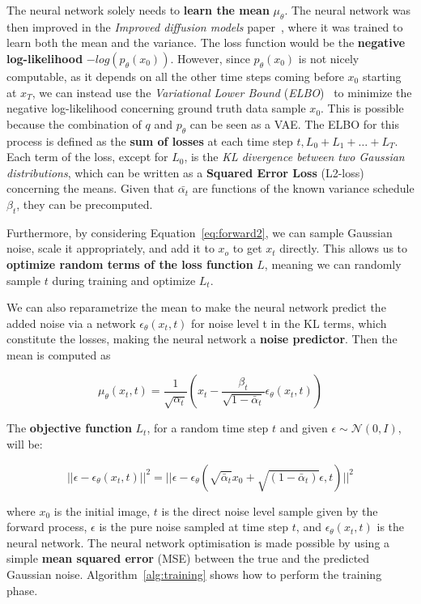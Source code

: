 \documentclass[preprint]{elsarticle}
\begin{document}
The neural network solely needs to \textbf{learn the mean} $\mu_\theta$.
The neural network was then improved in the \emph{Improved diffusion models} paper~\cite{nichol2021improved}, where it was trained to learn both the mean and the variance.
The loss function would be the \textbf{negative log-likelihood} $-log(p_\theta(x_0))$. 
However, since $p_\theta(x_0)$ is not nicely computable, as it depends on all the other time steps coming before  $x_0$ starting at $x_T$, we can instead use the \emph{Variational Lower Bound} (\emph{ELBO})~\cite{elbo} 
to minimize the negative log-likelihood concerning ground truth data sample $x_0$.
This is possible because the combination of $q$ and $p_\theta$ can be seen as a VAE.
The ELBO for this process is defined as the \textbf{sum of losses} at each time step $t, L_0 + L_1 + \dots + L_T$.
Each term of the loss, except for $L_0$, is the \emph{KL divergence between two Gaussian distributions},
which can be written as a \textbf{Squared Error Loss} (L2-loss) concerning the means.
Given that $\bar{\alpha_t}$ are functions of the known variance schedule $\beta_t$, they can be precomputed.

Furthermore, by considering Equation~\ref{eq:forward2}, we can sample Gaussian noise, 
scale it appropriately, and add it to $x_o$ to  get $x_t$ directly. This allows us
to \textbf{optimize random terms of the loss function} $L$, meaning we can randomly sample $t$ during training and optimize $L_t$.

We can also reparametrize the mean to make the neural network predict
the added noise via a network $\epsilon_\theta(x_t,t)$ for noise level t in the KL terms, which
constitute the losses, making the neural network a \textbf{noise predictor}.
Then the mean is computed as \cite{weng2021diffusion}

\begin{equation}
	\mu_\theta(x_t,t) =\frac{1}{\sqrt{\alpha_t}}\left(x_t - \frac{\beta_t}{\sqrt{1-\bar{\alpha}_t}}\epsilon_\theta(x_t,t)\right)
\end{equation}

The \textbf{objective function} $L_t$, for a random time step $t$ and given $\epsilon \sim \mathcal{N}(0,I)$, will be:

\begin{equation}
	||\epsilon-\epsilon_\theta(x_t,t)||^2 = ||\epsilon - \epsilon_\theta
	(\sqrt{\bar{\alpha}_t}x_0 + \sqrt{(1-\bar{\alpha}_t)}\epsilon,t) ||^2
\end{equation}

where $x_0$ is the initial image, $t$ is the direct noise level sample given by the
forward process, $\epsilon$ is the pure noise sampled at time step $t$, and 
$\epsilon_\theta(x_t,t)$ is the neural network. The neural network optimisation is made possible 
by using a simple \textbf{mean squared error} (MSE) between the true and the predicted Gaussian noise. Algorithm~\ref{alg:training} shows how to perform the training phase.
\end{document}
